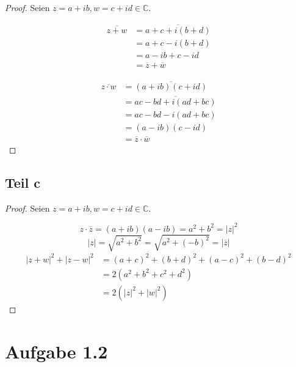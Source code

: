 \documentclass[10pt,a4paper]{article}
\begin{document}
\begin{proof}
  Seien $z = a + ib, w = c + id \in \mathbb{C}$.

  \begin{align*}
    \overline{z + w} & = \overline{a + c + i(b + d)}\\
                     & = a + c - i(b + d)\\
                     & = a - ib + c - id\\
                     & = \overline{z} + \overline{w}
  \end{align*}

  \begin{align*}
    \overline{z \cdot w} & = \overline{(a + ib)(c + id)}\\
                         & = \overline{ac - bd + i(ad + bc)}\\
                         & = ac - bd - i(ad + bc)\\
                         & = (a - ib)(c - id)\\
                         & = \overline{z} \cdot \overline{w}
  \end{align*}
\end{proof}

\subsection{Teil c}

\begin{proof}
  Seien $z = a + ib, w = c + id \in \mathbb{C}$.

  \begin{equation}
    z \cdot \overline{z} = (a + ib)(a - ib) = a^{2} + b^{2} = |z|^{2}
  \end{equation}
  \begin{equation}
    |z| = \sqrt{a^{2} + b^{2}} = \sqrt{a^{2} + (-b)^{2}} = |\overline{z}|
  \end{equation}
  \begin{align*}
    |z + w|^{2} + |z - w|^{2} & = (a + c)^{2} + (b + d)^{2} + (a - c)^{2} + (b - d)^{2}\\
                              & = 2(a^{2} + b^{2} + c^{2} + d^{2})\\
                              & = 2(|z|^{2} + |w|^{2})
  \end{align*}
\end{proof}

\section{Aufgabe 1.2}
\end{document}

